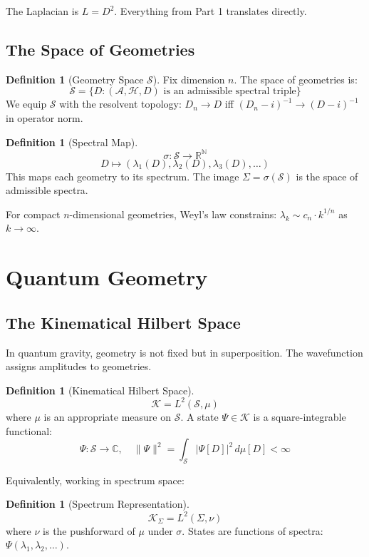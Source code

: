\documentclass[11pt,a4paper]{article}
\theoremstyle{definition}
\newtheorem{definition}[theorem]{Definition}
\theoremstyle{remark}
\begin{document}
The Laplacian is $L = D^2$. Everything from Part 1 translates directly.

\subsection{The Space of Geometries}

\begin{definition}[Geometry Space $\mathcal{S}$]
Fix dimension $n$. The space of geometries is:
\[
\mathcal{S} = \{ D : (\mathcal{A}, \mathcal{H}, D) \text{ is an admissible spectral triple} \}
\]
We equip $\mathcal{S}$ with the resolvent topology: $D_n \to D$ iff $(D_n - i)^{-1} \to (D - i)^{-1}$ in operator norm.
\end{definition}

\begin{definition}[Spectral Map]
\[
\sigma: \mathcal{S} \to \mathbb{R}^{\mathbb{N}}
\]
\[
D \mapsto (\lambda_1(D), \lambda_2(D), \lambda_3(D), \ldots)
\]
This maps each geometry to its spectrum. The image $\Sigma = \sigma(\mathcal{S})$ is the space of admissible spectra.
\end{definition}

For compact $n$-dimensional geometries, Weyl's law constrains: $\lambda_k \sim c_n \cdot k^{1/n}$ as $k \to \infty$.

\section{Quantum Geometry}

\subsection{The Kinematical Hilbert Space}

In quantum gravity, geometry is not fixed but in superposition. The wavefunction assigns amplitudes to geometries.

\begin{definition}[Kinematical Hilbert Space]
\[
\mathcal{K} = L^2(\mathcal{S}, \mu)
\]
where $\mu$ is an appropriate measure on $\mathcal{S}$. A state $\Psi \in \mathcal{K}$ is a square-integrable functional:
\[
\Psi: \mathcal{S} \to \mathbb{C}, \quad \|\Psi\|^2 = \int_{\mathcal{S}} |\Psi[D]|^2 \, d\mu[D] < \infty
\]
\end{definition}

Equivalently, working in spectrum space:

\begin{definition}[Spectrum Representation]
\[
\mathcal{K}_\Sigma = L^2(\Sigma, \nu)
\]
where $\nu$ is the pushforward of $\mu$ under $\sigma$. States are functions of spectra: $\Psi(\lambda_1, \lambda_2, \ldots)$.
\end{definition}
\end{document}
